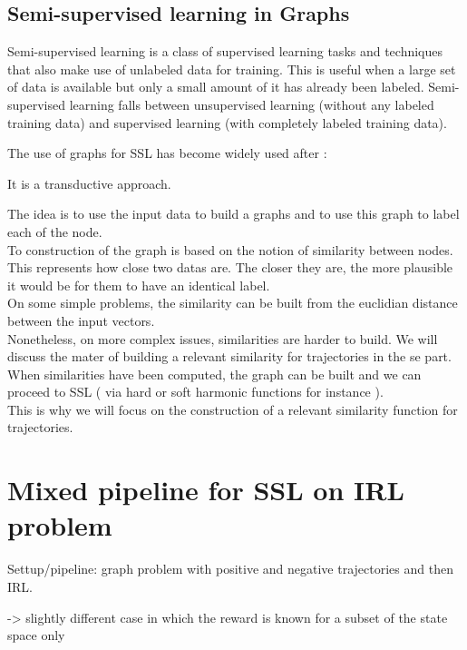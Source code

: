 \documentclass{article}
\begin{document}
\subsection{Semi-supervised learning in Graphs}


Semi-supervised learning is a class of supervised learning tasks and techniques that also make use of unlabeled data for training. This is useful when a large set of data is available but only a small amount of it has already been labeled. Semi-supervised learning falls between unsupervised learning (without any labeled training data) and supervised learning (with completely labeled training data).

The use of graphs for SSL has become widely used after : \cite{Zhu03}

It is a transductive approach.

The idea is to use the input data to build a graphs and to use this graph to label each of the node. \\
To construction of the graph is based on the notion of similarity between nodes.\\ This represents how close two datas are. The closer they are, the more plausible it would be for them to have an identical label.\\
On some simple problems, the similarity can be built from the euclidian distance between the input vectors.\\
Nonetheless, on more complex issues, similarities are harder to build. We will discuss the mater of building a relevant similarity for trajectories in the se part.
When similarities have been computed, the graph can be built and we can proceed to SSL ( via hard or soft harmonic functions for instance ).\\
This is why we will focus on the construction of a relevant similarity function for trajectories.

\section{Mixed pipeline for SSL on IRL problem \label{sec:combine}}

Settup/pipeline: graph problem with positive and negative trajectories and then IRL.

\cite{Valko12}
\cite{Audiffren15}
\cite{Finn17} -> slightly different case in which the reward is known for a subset of the state space only
\end{document}
